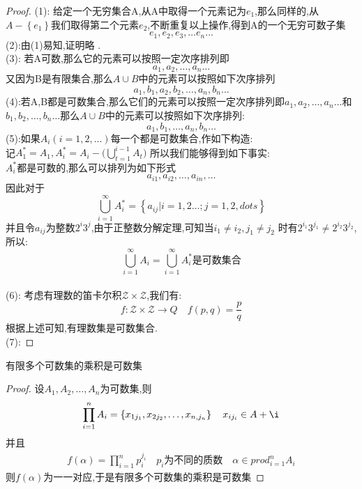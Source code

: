\begin{proof}
    (1): 给定一个无穷集合A,从A中取得一个元素记为\(e_1\),那么同样的,从\(A - \left\{e_1\right\} \)我们取得第二个元素\(e_2\),不断重复以上操作,得到A的一个无穷可数子集 \[e_1, e_2,e_3, \dots e_n \dots \]
    (2):由(1)易知,证明略 . \\ 
    (3): 若A可数,那么它的元素可以按照一定次序排列即\[a_1,a_2,\dots , a_n \dots\]又因为B是有限集合,那么\(A \cup B\)中的元素可以按照如下次序排列
    \[a_1,b_1,a_2,b_2,\dots ,a_n,b_n \dots\]
    (4):若A,B都是可数集合,那么它们的元素可以按照一定次序排列即\(a_1,a_2,\dots , a_n \dots\)和\(b_1,b_2,\dots , b_n \dots\)那么\(A \cup B\)中的元素可以按照如下次序排列:\[a_1,b_1,\dots , a_n,b_n \dots \]
    (5):如果\(A_i (i=1,2,\dots)\)每一个都是可数集合,作如下构造: \\ 
    记\(A^{*}_1 = A_1  , A^{*}_i = A_i - \bigl(\bigcup\limits_{t=1}^{i-1} A_t\bigr)\)
    所以我们能够得到如下事实: \\ 
   \(A^{*}_i\)都是可数的,那么可以排列为如下形式 \[a_{i1},a_{i2},\dots,a_{in},\dots\]
   因此对于\[\bigcup\limits_{i=1}^{\infty} A^{*}_i = \left\{a_{ij} | i= 1, 2 \dots ;j = 1,2 ,dots \right\}\]
   并且令\(a_{ij}\)为整数\(2^i3^j\),由于正整数分解定理,可知当\(i_1\neq i_2, j_1 \neq j_2\) 时有\(2^{i_1}3^{j_1} \neq 2^{i_2}3^{j_2}\),所以:\[\bigcup\limits_{i=1}^{\infty} A_i=\bigcup\limits_{i=1}^{\infty} A^{*}_i \text{是可数集合} \] 
   \\ 
   (6): 考虑有理数的笛卡尔积\(\mathcal{Z} \times \mathcal{Z}\),我们有:\[f:\mathcal{Z} \times \mathcal{Z} \rightarrow Q \quad f(p,q)=\frac{p}{q} \]根据上述可知,有理数集是可数集合. \\ 
   (7): 
\end{proof}
\begin{Theorem}
    有限多个可数集的乘积是可数集
\end{Theorem}
\begin{proof}
    设\(A_1,A_2,\dots,A_n\)为可数集,则\[\prod_{i=1}^{n} A_i = \left\{x_{1j_1}, x_{2j_2} ,\dots,x_{n,j_n} \right\} \quad x_{ij_i} \in A+\i\]
    并且\begin{align*}
        f(\alpha) = \prod_{i=1}^{n}p_{i}^{j_i} \quad p_i\text{为不同的质数} \quad \alpha \in prod_{i=1}^{n} A_i
    \end{align*}
    则\(f(\alpha)\)为一一对应,于是有限多个可数集的乘积是可数集
\end{proof}
